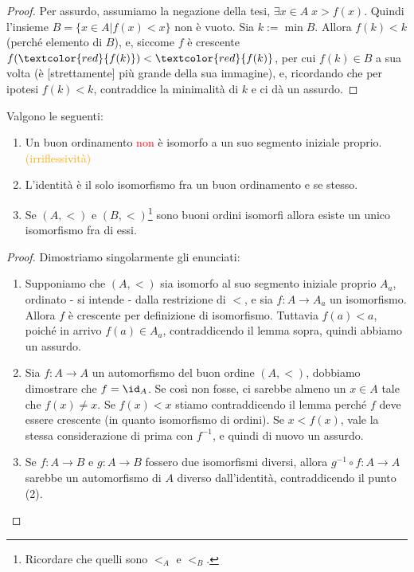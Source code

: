 \documentclass[11pt]{scrartcl}
\begin{document}
\begin{proof}
	Per assurdo, assumiamo la negazione della tesi, $\exists x \in A \; x > f(x)$. Quindi l'insieme $B = \{x \in A | f(x) < x\}$ non è vuoto. Sia $k := \min B$.
	Allora $f(k) < k$ (perché elemento di $B$), e, siccome $f$ è crescente $f(\textcolor{red}{f(k)}) < \textcolor{red}{f(k)}$, per cui $f(k) \in B$ a sua volta (è [strettamente] più grande della sua immagine),
	e, ricordando che per ipotesi $f(k)<k$, contraddice la minimalità di $k$ e ci dà un assurdo.
\end{proof}

\begin{corollary}
	Valgono le seguenti:
	\begin{enumerate}[(1)]
		\item Un buon ordinamento \textcolor{red}{non} è isomorfo a un suo segmento iniziale proprio. \textcolor{orange}{(irriflessività)}
		\item L'identità è il solo isomorfismo fra un buon ordinamento e se stesso.
		\item Se $(A,<)$ e $(B,<)$\footnote{Ricordare che quelli sono $<_A$ e $<_B$.} sono buoni ordini isomorfi allora esiste un unico isomorfismo fra di essi.
	\end{enumerate}
\end{corollary}

\begin{proof}
	Dimostriamo singolarmente gli enunciati:
	\begin{enumerate}[(1)]
		\item Supponiamo che $(A,<)$ sia isomorfo al suo segmento iniziale proprio $A_a$, ordinato - si intende - dalla restrizione di $<$, e sia $f : A \rightarrow A_a$ un isomorfismo.
		Allora $f$ è crescente per definizione di isomorfismo. Tuttavia $f(a) < a$, poiché in arrivo $f(a) \in A_a$, contraddicendo il lemma sopra, quindi abbiamo un assurdo.
		\item Sia $f : A \rightarrow A$ un automorfismo del buon ordine $(A,<)$, dobbiamo dimostrare che $f = \id_A$. Se così non fosse, ci sarebbe almeno un $x \in A$ tale che $f(x) \ne x$.
		Se $f(x) < x$ stiamo contraddicendo il lemma perché $f$ deve essere crescente (in quanto isomorfismo di ordini). Se $x < f(x)$, vale la stessa considerazione di prima con $f^{-1}$, e quindi di nuovo un assurdo.
		\item Se $f : A \rightarrow B$ e $g : A \rightarrow B$ fossero due isomorfismi diversi, allora $g^{-1} \circ f : A \rightarrow A$ sarebbe un automorfismo di $A$ diverso dall'identità,
		contraddicendo il punto (2).	
	\end{enumerate}
\end{proof}
\end{document}
